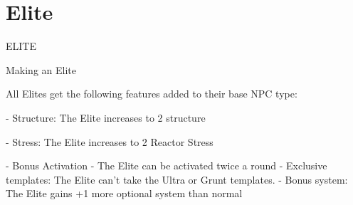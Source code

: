 \section{Elite}
                                                   ELITE  

Making an Elite
 
All Elites get the following features added to their base NPC type:
 
    -   Structure: The Elite increases to 2 structure
 
    -   Stress: The Elite increases to 2 Reactor Stress
 
    -    Bonus Activation - The Elite can be activated twice a round  
    -    Exclusive templates: The Elite can’t take the Ultra or Grunt templates.  
    -    Bonus system: The Elite gains +1 more optional system than normal  